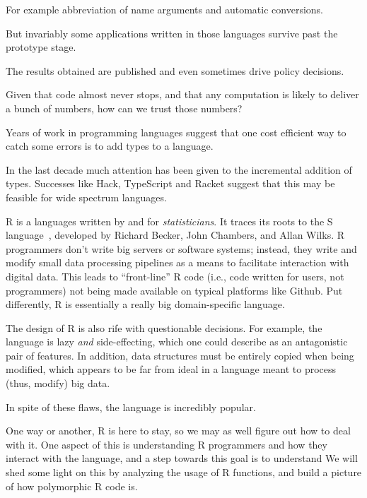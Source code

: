 \documentclass[acmsmall,10pt,review,anonymous]{acmart}\settopmatter{printfolios=true,printccs=false,printacmref=false}
\begin{document}
For example abbreviation of name arguments and automatic conversions.

But invariably some applications written in those languages survive past the
prototype stage.

The results obtained are published and even sometimes drive policy decisions.

Given that code almost never stops, and that any computation is likely to
deliver a bunch of numbers, how can we trust those numbers?

Years of work in programming languages suggest that one cost efficient way
to catch some errors is to add types to a language.

In the last decade much attention has been given to the incremental addition
of types. Successes like Hack, TypeScript and Racket suggest that this may
be feasible for wide spectrum languages.

R is a languages written by and for \textit{statisticians}.  It traces its
roots to the S language~\cite{becker1988new}, developed by Richard Becker, John Chambers, and Allan Wilks.  R programmers don't write big
servers or software systems; instead, they write and modify small data
processing pipelines as a means to facilitate interaction with digital data.
This leads to ``front-line'' R code (i.e., code written for users, not
programmers) not being made available on typical platforms like Github.
  Put differently, R is essentially a really big
domain-specific language.

The design of R is also rife with questionable decisions.  For example, the
language is lazy \textit{and} side-effecting, which one could describe as an
antagonistic pair of features.  In addition, data structures must be
entirely copied when being modified, which appears to be far from ideal in a
language meant to process (thus, modify) big data.

In spite of these flaws, the language is incredibly popular.

One way or another, R is here to stay, so we may as well figure out how to
deal with it.  One aspect of this is understanding R programmers and how
they interact with the language, and a step towards this goal is to
understand   We will shed some light on
this by analyzing the usage of R functions, and build a picture of how
polymorphic R code is.
\end{document}
